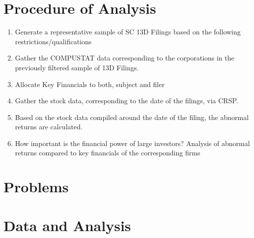 \documentclass[a4paper,12pt]{article}
\begin{document}
\section{Procedure of Analysis}
\begin{enumerate}
\item Generate a representative sample of SC 13D Filings based on the following restrictions/qualifications


\item Gather the COMPUSTAT data corresponding to the corporations in the previously filtered sample of 13D Filings.
\item Allocate Key Financials to both, subject and filer
\item Gather the stock data, corresponding to the date of the filings, via CRSP.
\item Based on the stock data compiled around the date of the filing, the abnormal returns are calculated. 
\item How important is the financial power of large investors? Analysis of abnormal returns compared to key financials of the corresponding firms

\end{enumerate}


\section{Problems}






\section{Data and Analysis}

\printbibliography
\end{document}
